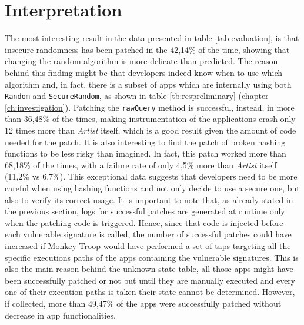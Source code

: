 \section{Interpretation}
The most interesting result in the data presented in table \ref{tab:evaluation}, is that insecure randomness has been patched in the 42,14\% of the time, showing that changing the random algorithm is more delicate than predicted. The reason behind this finding might be that developers indeed know when to use which algorithm and, in fact, there is a subset of apps which are internally using both \texttt{Random} and \texttt{SecureRandom}, as shown in table \ref{tb:respreliminary} (chapter \ref{ch:investigation}). Patching the \texttt{rawQuery} method is successful, instead, in more than 36,48\% of the times, making instrumentation of the applications crash only 12 times more than \emph{Artist} itself, which is a good result given the amount of code needed for the patch. It is also interesting to find the patch of broken hashing functions to be less risky than imagined. In fact, this patch worked more than 68,18\% of the times, with a failure rate of only 4,5\% more than \emph{Artist} itself (11,2\% vs 6,7\%). This exceptional data suggests that developers need to be more careful when using hashing functions and not only decide to use a secure one, but also to verify its correct usage. It is important to note that, as already stated in the previous section, logs for successful patches are generated at runtime only when the patching code is triggered. Hence, since that code is injected before each vulnerable signature is called, the number of successful patches could have increased if Monkey Troop would have performed a set of taps targeting all the specific executions paths of the apps containing the vulnerable signatures. This is also the main reason behind the unknown state table, all those apps might have been successfully patched or not but until they are manually executed and every one of their execution paths is taken their state cannot be determined.
However, if collected, more than 49,47\% of the apps were successfully patched without decrease in app functionalities.

